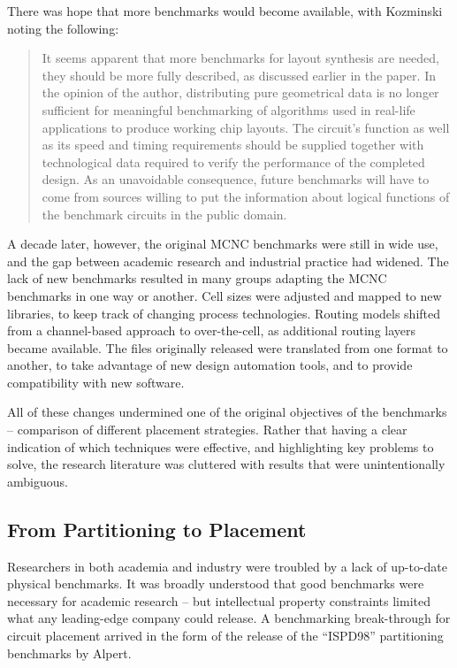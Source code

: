 \documentclass[sigconf]{acmart}
\begin{document}
There was hope that more benchmarks would
become available, with Kozminski\cite{Kozminski91} noting the following:

\begin{quote}
It seems apparent that more benchmarks for layout synthesis are
needed, they should be more fully described, as discussed earlier in
the paper. In the opinion of the author, distributing pure
geometrical data is no longer sufficient for meaningful benchmarking
of algorithms used in real-life applications to produce working chip
layouts. The circuit's function as well as its speed and timing
requirements should be supplied together with technological data
required to verify the performance of the completed design. As an
unavoidable consequence, future benchmarks will have to come from
sources willing to put the information about logical functions of the
benchmark circuits in the public domain.
\end{quote}

A decade later, however, the original MCNC
benchmarks were still in wide use, and
the gap between academic research and
industrial practice had widened.
The lack of new benchmarks resulted in many groups
adapting the MCNC benchmarks in one way or another.  Cell sizes
were adjusted and mapped to new libraries, to keep
track of changing process technologies.  Routing models
shifted from a channel-based approach to over-the-cell,
as additional routing layers became available.  The
files originally released were translated from one
format to another, to take advantage of new design
automation tools, and to provide compatibility with
new software.

All of these changes undermined one of the original objectives of the
benchmarks -- comparison of different placement strategies.  Rather
that having a clear indication of which techniques were effective, and
highlighting key problems to solve, the research literature was
cluttered with results that were unintentionally
ambiguous\cite{Madden010030}.

\subsection{From Partitioning to Placement}


Researchers in both academia and industry were troubled by a lack of
up-to-date physical benchmarks.  It was broadly understood that good
benchmarks were necessary for academic research -- but intellectual
property constraints limited what any leading-edge company could
release.  A benchmarking break-through for circuit placement arrived
in the form of the release of the ``ISPD98'' partitioning benchmarks by
Alpert\cite{Alpert980080}.
\end{document}
